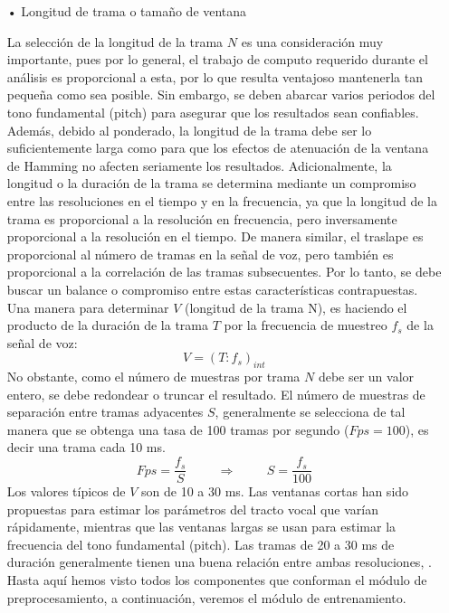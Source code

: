 \begin{enumerate}
\begin{enumerate}
\item[•]Longitud de trama o tamaño de ventana
\par
La selección de la longitud de la trama $N$ es una consideración muy importante, pues por lo general, el trabajo de computo requerido durante el análisis es proporcional a esta, por lo que resulta ventajoso mantenerla tan pequeña como sea posible. Sin embargo, se deben abarcar varios periodos del tono fundamental (pitch) para asegurar que los resultados sean confiables. Además, debido al ponderado, la longitud de la trama debe ser lo suficientemente larga como para que los efectos de atenuación de la ventana de Hamming no afecten seriamente los resultados. 
\vskip 0.5cm
Adicionalmente, la longitud o la duración de la trama se determina mediante un compromiso entre las resoluciones en el tiempo y en la frecuencia, ya que la longitud de la trama es proporcional a la resolución en frecuencia, pero inversamente proporcional a la resolución en el tiempo. De manera similar, el traslape es proporcional al número de tramas en la señal de voz, pero también es proporcional a la correlación de las tramas subsecuentes. Por lo tanto, se debe buscar un balance o compromiso entre estas características contrapuestas.
\vskip 0.5cm
Una manera para determinar $V$ (longitud de la trama N), es haciendo el producto de la duración de la trama $T$ por la frecuencia de muestreo $f_{s}$ de la señal de voz:
\begin{equation}
\label{eq:ecuacion38}
V = (T:f_{s})_{int}
\end{equation}
No obstante, como el número de muestras por trama $N$ debe ser un valor entero, se debe redondear o truncar el resultado. El número de muestras de separación entre tramas adyacentes $S$, generalmente se selecciona de tal manera que se obtenga una tasa de 100 tramas por segundo ($Fps = 100$), es decir una trama cada 10 ms.
\begin{equation}
\label{eq:ecuacion39}
Fps = \frac{f_{s}}{S} \hspace{1cm} \Rightarrow \hspace{1cm} S = \frac{f_{s}}{100}
\end{equation}
Los valores típicos de $V$ son de 10 a 30 ms. Las ventanas cortas han sido propuestas para estimar los parámetros del tracto vocal que varían rápidamente, mientras que las ventanas largas se usan para estimar la frecuencia del tono fundamental (pitch). Las tramas de 20 a 30 ms de duración generalmente tienen una buena relación entre ambas resoluciones, \cite{eyra}.
\vskip 0.5cm
Hasta aquí hemos visto todos los componentes que conforman el módulo de preprocesamiento, a continuación, veremos el módulo de entrenamiento.
\end{enumerate}
\end{enumerate}

